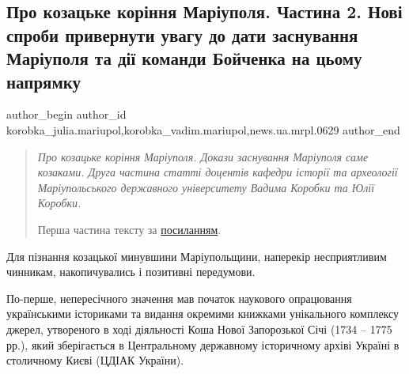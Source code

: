  
 
 
 
 
 
\subsection{Про козацьке коріння Маріуполя. Частина 2. Нові спроби привернути увагу до дати заснування Маріуполя та дії команди Бойченка на цьому напрямку}
\label{sec:04_09_2023.stz.news.ua.mrpl.0629.1.pro_kozacke_korinnja_mariupolja_2}
 
\ifcmt
 author_begin
   author_id korobka_julia.mariupol,korobka_vadim.mariupol,news.ua.mrpl.0629
 author_end
\fi

\begin{quote}
\em
Про козацьке коріння Маріуполя. Докази заснування Маріуполя саме козаками.
Друга частина статті доцентів кафедри історії та археології Маріупольського
державного університету Вадима Коробки та Юлії Коробки.

Перша частина тексту за \href{https://archive.org/details/01_09_2023.vadim_korobka.julia_korobka.mrpl.0629.pro_kozacke_korinnja_mariupolja_1}{посиланням}.
\end{quote}

Для пізнання козацької минувшини Маріупольщини, наперекір несприятливим
чинникам, накопичувались і позитивні передумови.

По-перше, непересічного значення  мав  початок наукового опрацювання
українськими істориками та видання окремими книжками унікального комплексу
джерел, утвореного в ході діяльності Коша Нової Запорозької Січі (1734 – 1775
рр.), який зберігається в Центральному державному історичному архіві Україні в
столичному Києві (ЦДІАК України).

